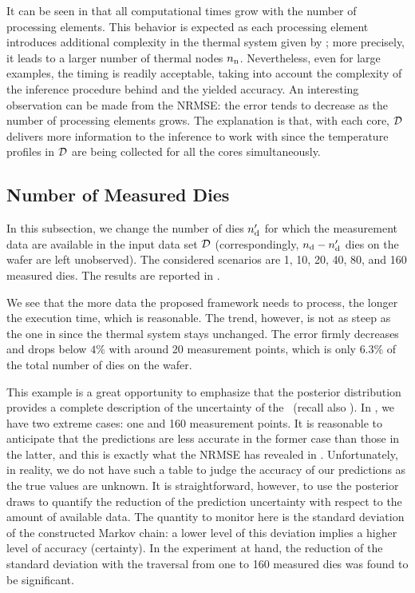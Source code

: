 It can be seen in  that all computational times grow with the number of processing elements. This behavior is expected as each processing element introduces additional complexity in the thermal system given by ; more precisely, it leads to a larger number of thermal nodes ${n_\text{n}}$. Nevertheless, even for large examples, the timing is readily acceptable, taking into account the complexity of the inference procedure behind and the yielded accuracy.
An interesting observation can be made from the NRMSE: the error tends to decrease as the number of processing elements grows. The explanation is that, with each core, $\mathcal{D}$ delivers more information to the inference to work with since the temperature profiles in $\mathcal{D}$ are being collected for all the cores simultaneously.

\subsection{Number of Measured Dies}
In this subsection, we change the number of dies ${n_\text{d}'}$ for which the measurement data are available in the input data set $\mathcal{D}$ (correspondingly, ${n_\text{d}} - {n_\text{d}'}$ dies on the wafer are left unobserved). The considered scenarios are 1, 10, 20, 40, 80, and 160 measured dies. The results are reported in .


We see that the more data the proposed framework needs to process, the longer the execution time, which is reasonable. The trend, however, is not as steep as the one in  since the thermal system stays unchanged.
The error firmly decreases and drops below $4\%$ with around 20 measurement points, which is only $6.3\%$ of the total number of dies on the wafer.

This example is a great opportunity to emphasize that the posterior distribution provides a complete description of the uncertainty of the \qoi\ (recall also ).
In , we have two extreme cases: one and 160 measurement points. It is reasonable to anticipate that the predictions are less accurate in the former case than those in the latter, and this is exactly what the NRMSE has revealed in .
Unfortunately, in reality, we do not have such a table to judge the accuracy of our predictions as the true values are unknown.
It is straightforward, however, to use the posterior draws to quantify the reduction of the prediction uncertainty with respect to the amount of available data.
The quantity to monitor here is the standard deviation of the constructed Markov chain: a lower level of this deviation implies a higher level of accuracy (certainty). In the experiment at hand, the reduction of the standard deviation with the traversal from one to 160 measured dies was found to be significant.

